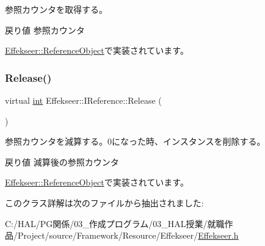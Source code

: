 参照カウンタを取得する。 

\begin{DoxyReturn}{戻り値}
参照カウンタ 
\end{DoxyReturn}


\mbox{\hyperlink{class_effekseer_1_1_reference_object_a4b8c3d79c58ca527850733691053cf5a}{Effekseer\+::\+Reference\+Object}}で実装されています。

\mbox{\label{class_effekseer_1_1_i_reference_ad8d601188c0f088f4748aa2da8758bb5}} 
\subsubsection{\texorpdfstring{Release()}{Release()}}
{\footnotesize\ttfamily virtual \mbox{\hyperlink{namespace_effekseer_ace0abf7c2e6947e519ebe8b54cbcc30a}{int}} Effekseer\+::\+I\+Reference\+::\+Release (\begin{DoxyParamCaption}{ }\end{DoxyParamCaption})\hspace{0.3cm}{\ttfamily [pure virtual]}}



参照カウンタを減算する。0になった時、インスタンスを削除する。 

\begin{DoxyReturn}{戻り値}
減算後の参照カウンタ 
\end{DoxyReturn}


\mbox{\hyperlink{class_effekseer_1_1_reference_object_a6b0e9aa4d994b557d499b15359b580d8}{Effekseer\+::\+Reference\+Object}}で実装されています。



このクラス詳解は次のファイルから抽出されました\+:\begin{DoxyCompactItemize}
\item 
C\+:/\+H\+A\+L/\+P\+G関係/03\+\_\+作成プログラム/03\+\_\+\+H\+A\+L授業/就職作品/\+Project/source/\+Framework/\+Resource/\+Effekseer/\mbox{\hyperlink{_effekseer_8h}{Effekseer.\+h}}\end{DoxyCompactItemize}
